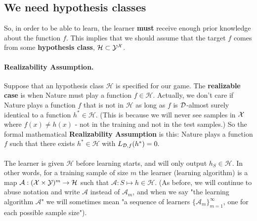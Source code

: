 \documentclass[11pt]{article}
\newcommand{\Ac}{\mathcal{A}}
\newcommand{\Hc}{\mathcal{H}}
\begin{document}


\subsection{We need hypothesis classes}

So, in order to be able to learn, the learner {\bf must} receive enough prior knowledge about the function $f$.
This implies that we should assume that the target $f$ comes from some \textbf{hypothesis class}, $\Hc \subset \Y^\X$. 

\paragraph{Realizability Assumption.} Suppose that an hypothesis class $\Hc$ is specified for our game. The {\bf realizable case} is when Nature must play a function $f\in\Hc$. Actually, we don't care if Nature plays a function $f$ that is not in $\Hc$ as long as $f$ is $\mathcal{D}$-almost surely identical to a function $h^*\in\Hc$.  (This is because we will never see samples in $\mathcal{X}$ where $f(x)\neq h(x)$ - not in the training and not in the test samples.) So the formal mathematical {\bf Realizability Assumption} is this: Nature plays a function $f$ such that there exists $h^*\in\Hc$ with $L_{\mathcal{D},f}(h^*)=0.$
\\~\\
The learner is given $\Hc$ before learning starts, and will only output $h_S\in\Hc$. In other words, for a training sample of size $m$ the learner (learning algorithm) is a map $\Ac:(\X\times\Y)^m\to\Hc$ such that $\Ac:S\mapsto h\in\Hc$. (As before, we will continue to abuse notation and write $\Ac$ instead of $\Ac_m$, and when we say "the learning algorithm $\Ac$" we will sometimes mean "a sequence of learners $\{\Ac_m\}_{m=1}^\infty$, one for each possible sample size").
\end{document}
